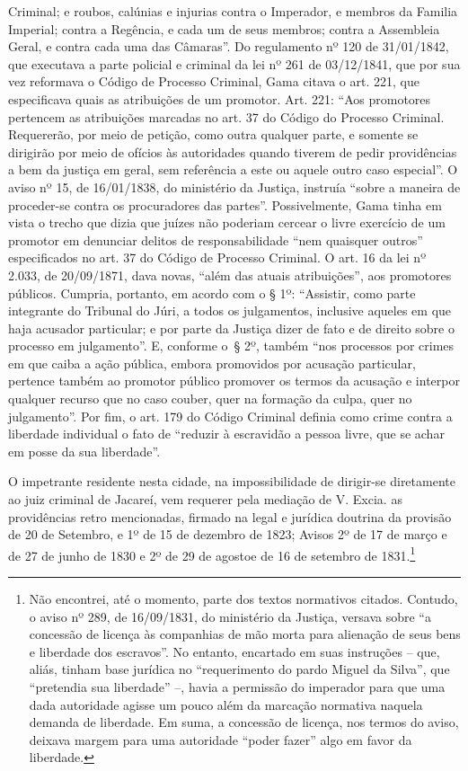 {{  Criminal; e roubos, calúnias e injurias contra o Imperador, e membros
  da Familia Imperial; contra a Regência, e cada um de seus membros;
  contra a Assembleia Geral, e contra cada uma das Câmaras''. Do
  regulamento nº 120 de 31/01/1842, que executava a parte policial e
  criminal da lei nº 261 de 03/12/1841, que por sua vez reformava o
  Código de Processo Criminal, Gama citava o art. 221, que especificava
  quais as atribuições de um promotor. Art. 221: ``Aos promotores
  pertencem as atribuições marcadas no art. 37 do Código do Processo
  Criminal. Requererão, por meio de petição, como outra qualquer parte,
  e somente se dirigirão por meio de ofícios às autoridades quando
  tiverem de pedir providências a bem da justiça em geral, sem
  referência a este ou aquele outro caso especial''. O aviso nº 15, de
  16/01/1838, do ministério da Justiça, instruía ``sobre a maneira de
  proceder-se contra os procuradores das partes''. Possivelmente, Gama
  tinha em vista o trecho que dizia que juízes não poderiam cercear o
  livre exercício de um promotor em denunciar delitos de
  responsabilidade ``nem quaisquer outros'' especificados no art. 37 do
  Código de Processo Criminal. O art. 16 da lei nº 2.033, de 20/09/1871,
  dava novas, ``além das atuais atribuições'', aos promotores públicos.
  Cumpria, portanto, em acordo com o § 1º: ``Assistir, como parte
  integrante do Tribunal do Júri, a todos os julgamentos, inclusive
  aqueles em que haja acusador particular; e por parte da Justiça dizer
  de fato e de direito sobre o processo em julgamento''. E, conforme o~§
  2º, também ``nos processos por crimes em que caiba a ação pública,
  embora promovidos por acusação particular, pertence também ao promotor
  público promover os termos da acusação e interpor qualquer recurso que
  no caso couber, quer na formação da culpa, quer no julgamento''. Por
  fim, o art. 179 do Código Criminal definia como crime contra a
  liberdade individual o fato de ``reduzir à escravidão a pessoa livre,
  que se achar em posse da sua liberdade''.}

O impetrante residente nesta cidade, na impossibilidade de dirigir-se
diretamente ao juiz criminal de Jacareí, vem requerer pela mediação de
V. Excia. as providências retro mencionadas, firmado na legal e jurídica
doutrina da provisão de 20 de Setembro, e 1º de 15 de dezembro de 1823;
Avisos 2º de 17 de março e de 27 de junho de 1830 e 2º de 29 de agostoe
de 16 de setembro de 1831.\footnote{ Não encontrei, até o momento,
  parte dos textos normativos citados. Contudo, o aviso nº 289, de
  16/09/1831, do ministério da Justiça, versava sobre ``a concessão de
  licença às companhias de mão morta para alienação de seus bens e
  liberdade dos escravos''. No entanto, encartado em suas instruções --
  que, aliás, tinham base jurídica no ``requerimento do pardo Miguel da
  Silva'', que ``pretendia sua liberdade'' --, havia a permissão do
  imperador para que uma dada autoridade agisse um pouco além da
  marcação normativa naquela demanda de liberdade. Em suma, a concessão
  de licença, nos termos do aviso, deixava margem para uma autoridade
  ``poder fazer'' algo em favor da liberdade.}

}
